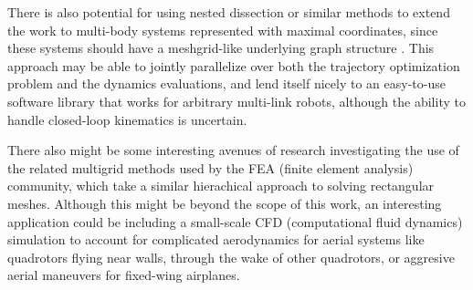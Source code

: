 \documentclass[../root.tex]{subfiles}
\begin{document}
There is also potential for using nested dissection or similar methods to extend the work 
to multi-body systems represented with maximal coordinates, since these systems should have
a meshgrid-like underlying graph structure \cite{brudigam_LinearTime_2020}. This approach 
may be able to jointly parallelize over both the trajectory optimization problem and 
the dynamics evaluations, and lend itself nicely to an easy-to-use software library 
that works for arbitrary multi-link robots, although the ability to handle closed-loop 
kinematics is uncertain.

There also might be some interesting avenues of research investigating the use of the 
related multigrid methods used by the FEA (finite element analysis) community, which 
take a similar hierachical approach to solving rectangular meshes. Although this might 
be beyond the scope of this work, an interesting application could be including a 
small-scale CFD (computational fluid dynamics) simulation to account for complicated 
aerodynamics for aerial systems like quadrotors flying near walls, through the wake 
of other quadrotors, or aggresive aerial maneuvers for fixed-wing airplanes.
\end{document}
